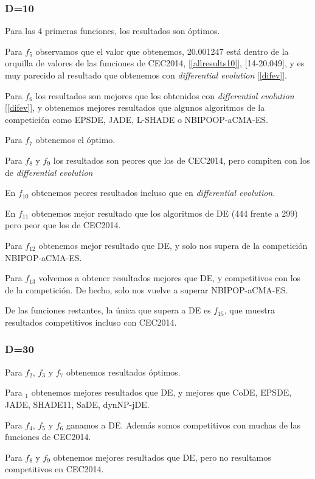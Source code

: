 \documentclass[a4paper,11pt]{article}
\begin{document}
\begin{itemize}
  \subsubsection{D=10}
  Para las 4 primeras funciones, los resultados son óptimos.
  
  Para $f_5$ observamos que el valor que obtenemos, 20.001247 está dentro de la orquilla de valores de las funciones de CEC2014,
  [\ref{allresults10}], [14-20.049], y es muy parecido al resultado que obtenemos con \textit{differential evolution} [\ref{difev}].
  
  Para $f_6$ los resultados son mejores que los obtenidos con \textit{differential evolution} [\ref{difev}], y obtenemos
  mejores resultados que algunos algoritmos de la competición como EPSDE, JADE, L-SHADE o NBIPOOP-aCMA-ES.
  
  Para $f_7$ obtenemos el óptimo.
  
  Para $f_8$ y $f_9$ los resultados son peores que los de CEC2014, pero compiten con los de \textit{differential evolution}
  
  En $f_{10}$ obtenemos peores resultados incluso que en \textit{differential evolution}.
  
  En $f_{11}$ obtenemos mejor resultado que los algoritmos de DE (444 frente a 299) pero peor que los de CEC2014.
  
  Para $f_{12}$ obtenemos mejor resultado que DE, y solo nos supera de la competición NBIPOP-aCMA-ES.
  
  Para $f_{13}$ volvemos a obtener resultados mejores que DE, y competitivos con los de la competición. De hecho, solo nos
  vuelve a superar NBIPOP-aCMA-ES.
  
  De las funciones restantes, la única que supera a DE es $f_{15}$, que muestra resultados competitivos incluso con CEC2014.
  
  \subsubsection{D=30}
  
  Para $f_2$, $f_3$ y $f_7$ obtenemos resultados óptimos.
  
  Para $_1$ obtenemos mejores resultados que DE, y mejores que CoDE, EPSDE, JADE, SHADE11, SaDE, dynNP-jDE.
  
  Para $f_4$, $f_5$ y $f_6$ ganamos a DE. Además somos competitivos con muchas de las funciones de CEC2014.
  
  Para $f_8$ y $f_9$ obtenemos mejores resultados que DE, pero no resultamos competitivos en CEC2014.
  

\end{itemize}
\end{document}
